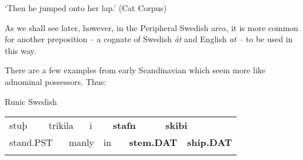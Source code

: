 \begin{styleTranslation}
‘Then he jumped onto her lap.’ (Cat Corpus)

\end{styleTranslation}

\begin{styleBodyTextFirst}
As we shall see later, however, in the Peripheral Swedish area, it is more common for another preposition – a cognate of Swedish \textit{åt} and English \textit{at} – to be used in this way.

\end{styleBodyTextFirst}

\begin{styleBodytextC}
There are a few examples from early Scandinavian which seem more like adnominal possessors. Thus:

\end{styleBodytextC}

\begin{listWWNumileveli}
\item {}

\end{listWWNumileveli}

\begin{listWWNumlxxvleveli}
\item {}

\begin{styleExLtrTbl}
Runic Swedish

\end{styleExLtrTbl}

\end{listWWNumlxxvleveli}

\begin{tabular}{llllllllll}
\lsptoprule
stuþ & \multicolumn{2}{l}{trikila

} & \multicolumn{2}{l}{i

} & \multicolumn{2}{l}{{\bfseries stafn}

} & \multicolumn{2}{l}{{\bfseries skibi}

} & \\
\multicolumn{2}{l}{stand.PST

} & \multicolumn{2}{l}{manly

} & \multicolumn{2}{l}{in

} & \multicolumn{2}{l}{{\bfseries stem.DAT}

} & \multicolumn{2}{l}{{\bfseries ship.DAT}

}\\
\lspbottomrule
\end{tabular}

